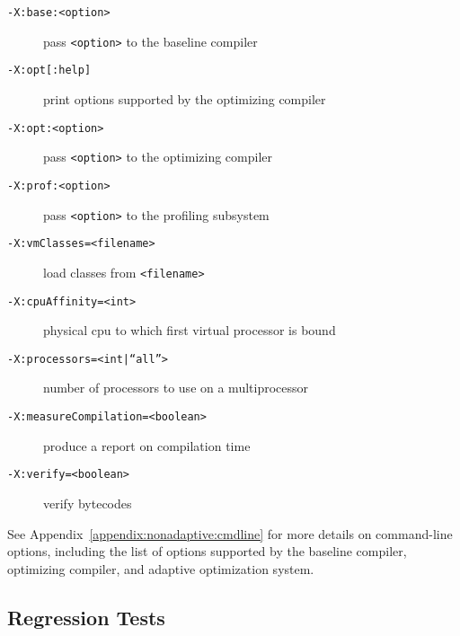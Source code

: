 \begin{description}
\item[{\tt -X:base:<option>}]
pass {\tt <option>} to the baseline compiler

\item[{\tt -X:opt[:help]}]
print options supported by the optimizing compiler

\item[{\tt -X:opt:<option>}]
pass {\tt <option>} to the optimizing compiler

\item[{\tt -X:prof:<option>}]
pass {\tt <option>} to the profiling subsystem

\item[{\tt -X:vmClasses=<filename>}]
load classes from {\tt <filename>}

\item[{\tt -X:cpuAffinity=<int>}]
physical cpu to which first virtual processor is bound

\item[{\tt -X:processors=<int|``all''>}]
number of processors to use on a multiprocessor

\item[{\tt -X:measureCompilation=<boolean>}]
produce a report on compilation time

\item[{\tt -X:verify=<boolean>}] verify bytecodes
\end{description}

See Appendix~\ref{appendix:nonadaptive:cmdline} for more details on 
command-line options, including the list of options supported by the 
baseline compiler, optimizing compiler, and adaptive optimization system.

\JikesTMFooter

\JavaTMFooter

\subsection{Regression Tests}

